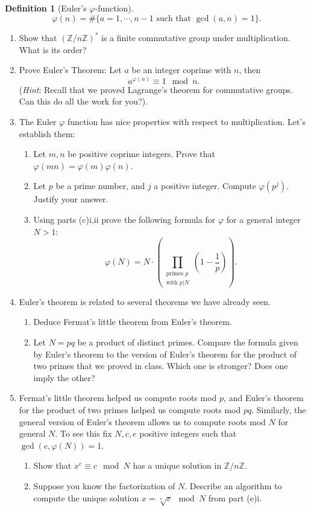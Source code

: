 \documentclass[11pt]{article}
\newtheorem{definition}{Definition}
\newcommand{\bZ}{\mathbb{Z}}
\begin{document}
\begin{enumerate}
{\begin{definition}[Euler's $\varphi$-function]
    \[\varphi(n) = \#\{a = 1,\cdots,n-1\text{ such that }\gcd(a,n) = 1\}.\]
  \end{definition}
  \begin{enumerate}
    \item{
    Show that $(\bZ/n\bZ)^*$ is a finite commutative group under multiplication.  What is its order?
    }
    \item{
    Prove Euler's Theorem: Let $a$ be an integer coprime with $n$, then
    \[a^{\varphi(n)}\equiv1\mod n.\]
    (\textit{Hint}: Recall that we proved Lagrange's theorem for commutative groups.  Can this do all the work for you?).
    }
    \item{The Euler $\varphi$ function has nice properties with respect to multiplication.  Let's establish them:
    \begin{enumerate}
      \item{
      Let $m,n$ be positive coprime integers.  Prove that $\varphi(mn)=\varphi(m)\varphi(n)$.
      }
      \item{
      Let $p$ be a prime number, and $j$ a positive integer.  Compute $\varphi(p^j)$.  Justify your answer.
      }
      \item{
      Using parts (c)i,ii prove the following formula for $\varphi$ for a general integer $N>1$:
      \[\varphi(N) = N\cdot\left(\prod_{\substack{\text{primes }p\\ \text{with }p|N}}\left(1-\frac{1}{p}\right)\right).\]
      }
    \end{enumerate}
    }
    \item{
    Euler's theorem is related to several theorems we have already seen.
    \begin{enumerate}
      \item{
      Deduce Fermat's little theorem from Euler's theorem.
      }
      \item{
      Let $N=pq$ be a product of distinct primes.  Compare the formula given by Euler's theorem to the version of Euler's theorem for the product of two primes that we proved in class.  Which one is stronger?  Does one imply the other?
      }
    \end{enumerate}
    }
    \item{
    Fermat's little theorem helped us compute roots mod $p$, and Euler's theorem for the product of two primes helped us compute roots mod $pq$.  Similarly, the general version of Euler's theorem allows us to compute roots mod $N$ for general $N$.  To see this fix $N,c,e$ positive integers such that $\gcd(e,\varphi(N)) = 1$.
    \begin{enumerate}
      \item{
      Show that $x^e\equiv c\mod N$ has a unique solution in $\bZ/n\bZ$.
      }
      \item{
      Suppose you know the factorization of $N$.  Describe an algorithm to compute the unique solution $x = \sqrt[e]{c}\mod N$ from part (e)i.
      }
    \end{enumerate}
    }
  \end{enumerate}
  }
\end{enumerate}
\end{document}
